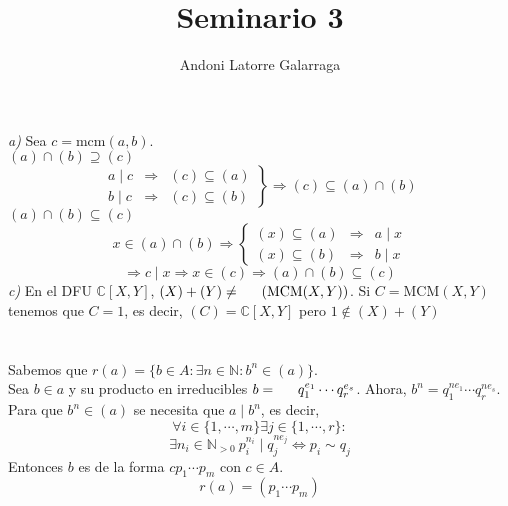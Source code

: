 \documentclass{article}
\title{Seminario 3}
\author{Andoni Latorre Galarraga}
\date{}
\newcommand{\bb}[1]{\mathbb{#1}}
\begin{document}
\maketitle
\begin{multicols}{2}
\section{} %
\textit{a)} Sea $c = \text{mcm}(a, b)$.\\
\indent \indent $\boxed{(a)\cap(b)\supseteq (c)}$
$$
\left.\begin{array}{rcl}
    a\mid c & \Rightarrow & (c) \subseteq (a) \\
    b\mid c & \Rightarrow & (c) \subseteq (b)
\end{array}\right\} \Rightarrow (c) \subseteq (a) \cap (b)
$$
\indent \indent $\boxed{(a)\cap(b)\subseteq (c)}$
$$
x\in (a) \cap (b) \Rightarrow
\left\{\begin{array}{lcr}
    (x) \subseteq (a) & \Rightarrow & a\mid x \\
    (x) \subseteq (b) & \Rightarrow & b\mid x
\end{array}\right.
$$
$$
\Rightarrow
c \mid x \Rightarrow x\in (c) \Rightarrow (a) \cap (b) \subseteq (c)
$$
\indent \textit{c)} En el DFU $\bb{C}[X, Y]$, $(X)+(Y)\ne \indent (\text{MCM}(X,Y))$. Si $C = \text{MCM}(X,Y)$ tenemos que \indent $C = 1$, es decir, $(C) = \bb{C}[X,Y]$ pero $1\notin (X) + (Y)$

\section{}
Sabemos que $r(a)= \{b\in A : \exists n \in \bb{N} : b^n \in(a)\}$. \\
\indent Sea $b \in a$ y su producto en irreducibles $b = \indent q_1^{e_1} \cdots q_r^{e_s}$. Ahora, $b^n = q_1^{n e_1} \cdots q_r^{n e_s}$. Para que \indent $b^n \in (a)$ se necesita que $a\mid b^n$, es decir,
$$
\forall i \in \{1, \cdots, m\} \exists j \in \{1, \cdots, r\} :
$$
$$
\exists n_i\in\bb{N}_{>0} \: p_i^{n_i} \mid q_j^{ne_j} \Leftrightarrow p_i \sim q_j
$$
\indent Entonces $b$ es de la forma $cp_1\cdots p_m$ con $c\in A$.
$$
r(a) = (p_1\cdots p_m)
$$


\end{multicols}
\end{document}
